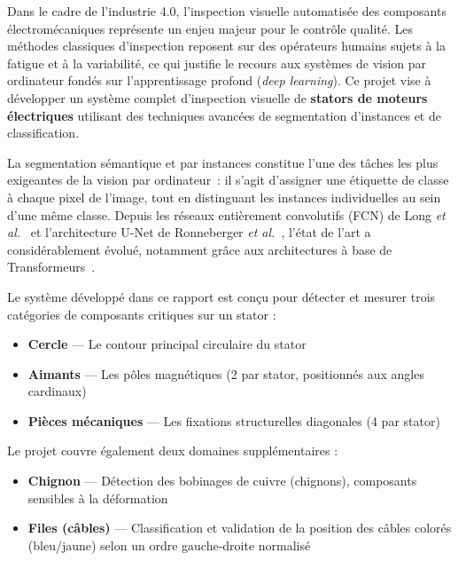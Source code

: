 \documentclass[12pt,a4paper]{report}
\begin{document}
Dans le cadre de l'industrie 4.0, l'inspection visuelle automatis\'ee des composants \'electrom\'ecaniques repr\'esente un enjeu majeur pour le contr\^ole qualit\'e. Les m\'ethodes classiques d'inspection reposent sur des op\'erateurs humains sujets \`a la fatigue et \`a la variabilit\'e, ce qui justifie le recours aux syst\`emes de vision par ordinateur fond\'es sur l'apprentissage profond (\textit{deep learning}). Ce projet vise \`a d\'evelopper un syst\`eme complet d'inspection visuelle de \textbf{stators de moteurs \'electriques} utilisant des techniques avanc\'ees de segmentation d'instances et de classification.

La segmentation s\'emantique et par instances constitue l'une des t\^aches les plus exigeantes de la vision par ordinateur~: il s'agit d'assigner une \'etiquette de classe \`a chaque pixel de l'image, tout en distinguant les instances individuelles au sein d'une m\^eme classe. Depuis les r\'eseaux enti\`erement convolutifs (FCN) de Long \textit{et al.}~\cite{long2015fcn} et l'architecture U-Net de Ronneberger \textit{et al.}~\cite{ronneberger2015unet}, l'\'etat de l'art a consid\'erablement \'evolu\'e, notamment gr\^ace aux architectures \`a base de Transformeurs~\cite{xie2021segformer}.

Le syst\`eme d\'evelopp\'e dans ce rapport est con\c{c}u pour d\'etecter et mesurer trois cat\'egories de composants critiques sur un stator :
\begin{itemize}[leftmargin=2cm]
    \item \textbf{Cercle} --- Le contour principal circulaire du stator
    \item \textbf{Aimants} --- Les p\^oles magn\'etiques (2 par stator, positionn\'es aux angles cardinaux)
    \item \textbf{Pi\`eces m\'ecaniques} --- Les fixations structurelles diagonales (4 par stator)
\end{itemize}

Le projet couvre \'egalement deux domaines suppl\'ementaires :
\begin{itemize}[leftmargin=2cm]
    \item \textbf{Chignon} --- D\'etection des bobinages de cuivre (chignons), composants sensibles \`a la d\'eformation
    \item \textbf{Files (c\^ables)} --- Classification et validation de la position des c\^ables color\'es (bleu/jaune) selon un ordre gauche-droite normalis\'e
\end{itemize}
\end{document}
